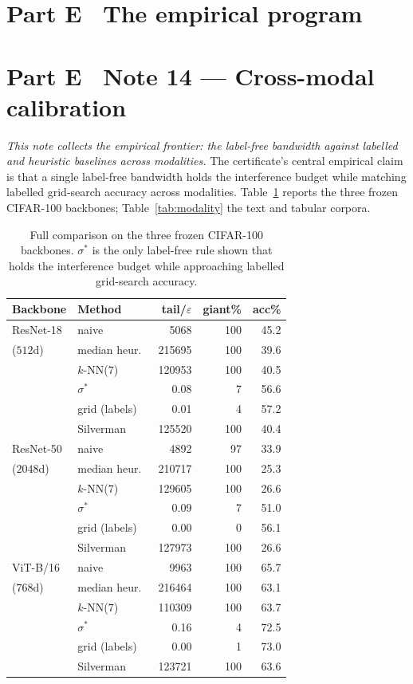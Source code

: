 \documentclass[10pt,twocolumn]{article}
\newcommand{\sstar}{\sigma^{*}}
\begin{document}
\FloatBarrier
\section*{Part E \textperiodcentered\ The empirical program}

\section*{Part E \textperiodcentered\ Note 14 --- Cross-modal calibration}
\emph{This note collects the empirical frontier: the label-free bandwidth against labelled and heuristic baselines across modalities.}
The certificate's central empirical claim is that a single label-free bandwidth holds the interference budget while matching labelled grid-search accuracy across modalities. Table~\ref{tab:multibb} reports the three frozen CIFAR-100 backbones; Table~\ref{tab:modality} the text and tabular corpora.
\begin{table}[H]
\centering
\small
\begin{tabular}{llrrr}
\toprule
Backbone & Method & tail/$\varepsilon$ & giant\% & acc\% \\
\midrule
ResNet-18  & naive          & 5068     & 100 & 45.2 \\
($512$d)   & median heur.\  & 215695   & 100 & 39.6 \\
           & $k$-NN($7$)    & 120953   & 100 & 40.5 \\
           & $\sstar$       & 0.08     & 7   & 56.6 \\
           & grid (labels)  & 0.01     & 4   & 57.2 \\
           & Silverman      & 125520   & 100 & 40.4 \\
\midrule
ResNet-50  & naive          & 4892     & 97  & 33.9 \\
($2048$d)  & median heur.\  & 210717   & 100 & 25.3 \\
           & $k$-NN($7$)    & 129605   & 100 & 26.6 \\
           & $\sstar$       & 0.09     & 7   & 51.0 \\
           & grid (labels)  & 0.00     & 0   & 56.1 \\
           & Silverman      & 127973   & 100 & 26.6 \\
\midrule
ViT-B/16   & naive          & 9963     & 100 & 65.7 \\
($768$d)   & median heur.\  & 216464   & 100 & 63.1 \\
           & $k$-NN($7$)    & 110309   & 100 & 63.7 \\
           & $\sstar$       & 0.16     & 4   & 72.5 \\
           & grid (labels)  & 0.00     & 1   & 73.0 \\
           & Silverman      & 123721   & 100 & 63.6 \\
\bottomrule
\end{tabular}
\caption{Full comparison on the three frozen CIFAR-100 backbones. $\sstar$ is the only label-free rule shown that holds the interference budget while approaching labelled grid-search accuracy.}
\label{tab:multibb}
\end{table}
\end{document}
